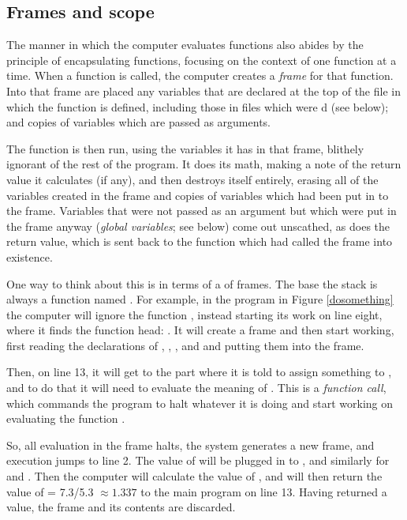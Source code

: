 \subsection{Frames and scope}  
The manner in which the computer evaluates functions also abides by the
principle of encapsulating functions, focusing on the context of one
function at a time. When a function is called, the computer creates a
{\sl frame} for that function. Into that frame are placed any variables
that are declared at the top of the file in which the function is defined,
including those in files which were d (see below); and copies of
variables which are passed as arguments. 

The function is then run, using the variables it has in that frame,
blithely ignorant of the rest of the program. It does its math, making a
note of the return value it calculates (if any), and then destroys itself
entirely, erasing all of the variables created in the frame and copies
of variables which had been put in to the frame. Variables that were not
passed as an argument but which were put in the frame anyway ({\sl global
variables}; see below) come out unscathed, as does the return value, which
is sent back to the function which had called the frame into existence.

\lstset{numbers=left, numberstyle=\scshape}
\lstset{numbers=none}

One way to think about this is in terms of a  of frames. 
The base the stack is always a function named . 
For example, in the program in Figure \ref{dosomething} 
the computer will ignore the function
, instead starting its work on line eight, where it
finds the  function head: . It will
create a  frame and
then start working, first reading the declarations of ,
, , and  and putting them
into the frame.

Then, on line 13, it will get to the part where it is told to
assign something to , and to do that it will need
to evaluate the meaning of . This is a {\em function call}, which commands the program
to halt whatever it is doing and start working on evaluating the
function . 

So, all evaluation in the  frame halts, 
the system generates a new frame, and execution jumps to 
line 2. The value of 
will be plugged in to , and similarly for  and
. Then the computer will calculate the value of , and will then return the value of  =
7.3/5.3 $\approx 1.337$ to the main program on line 13. Having returned
a value, the  frame and its contents are
discarded.

